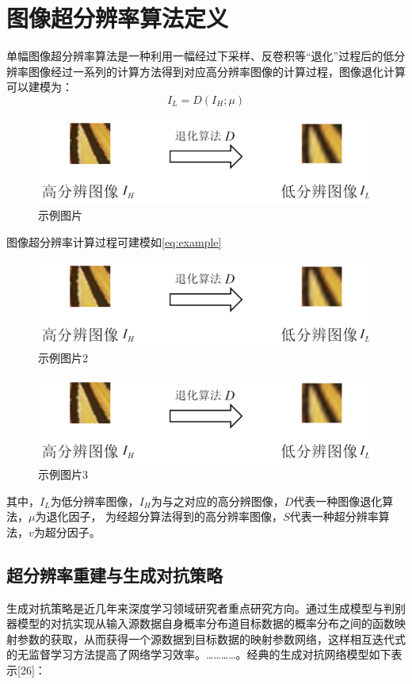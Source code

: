 
\chapter{图像超分辨率算法定义} 

单幅图像超分辨率算法是一种利用一幅经过下采样、反卷积等“退化”过程后的低分辨率图像经过一系列的计算方法得到对应高分辨率图像的计算过程，图像退化计算可以建模为：
\begin{equation}
    \label{eq:example}
    I_L = D \left( I_H ; \mu  \right)
\end{equation}

\begin{figure}[h]
    \centering
    \includegraphics[width=0.42\linewidth]{./content/test.png}
    \caption{示例图片}
    \label{fig:example}
\end{figure}

图像超分辨率计算过程可建模如\eqref{eq:example}

\begin{figure}[h]
    \centering
    \includegraphics[width=0.42\linewidth]{./content/test.png}
    \caption{示例图片2}
    \label{fig:example2}
\end{figure}

\begin{figure}[h]
    \centering
    \includegraphics[width=0.42\linewidth]{./content/test.png}
    \caption{示例图片3}
    \label{fig:example3}
\end{figure}


其中，$I_L$为低分辨率图像，$I_H$为与之对应的高分辨图像，$D$代表一种图像退化算法，$\mu$为退化因子， 为经超分算法得到的高分辨率图像，$S$代表一种超分辨率算法，$v$为超分因子。

\section{超分辨率重建与生成对抗策略}

生成对抗策略是近几年来深度学习领域研究者重点研究方向。通过生成模型与判别器模型的对抗实现从输入源数据自身概率分布道目标数据的概率分布之间的函数映射参数的获取，从而获得一个源数据到目标数据的映射参数网络，这样相互迭代式的无监督学习方法提高了网络学习效率。…………。经典的生成对抗网络模型如下表示[26]：


